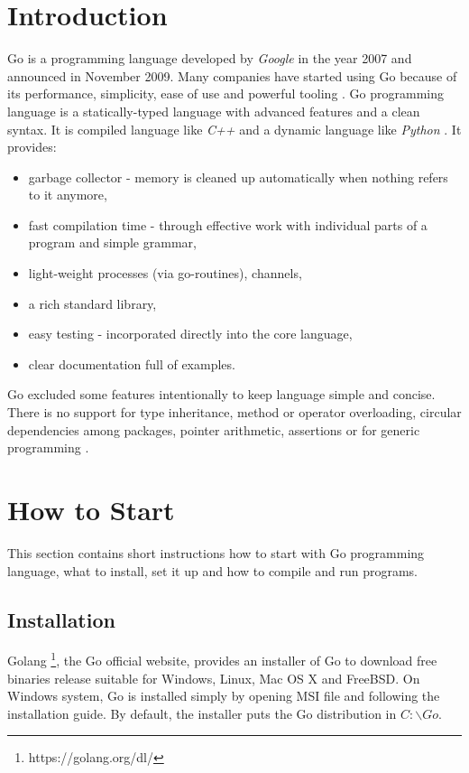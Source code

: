 \documentclass[
  12pt, 
  digital, %
  notable,   %
  nolof,     %
  nolot,     %
]{fithesis3}
\begin{document}
\section{Introduction}
Go is a programming language developed by \textit{Google} in the year 2007 and announced in 
November 2009. Many companies have started using Go because of its performance, simplicity, 
ease of use and powerful tooling \cite{doxsey2016introducing}. Go programming language is a 
statically-typed language with advanced features and a clean syntax. It is compiled language like \textit{C++} and a dynamic language like \textit{Python} \cite{harris_2015}. It provides:
\vskip0.1in
\begin{itemize}[leftmargin=2em,rightmargin=1em,itemsep=0.75\parskip,parsep=0em,topsep=0em,partopsep=0em]
\item garbage collector - memory is cleaned up automatically when nothing refers to it 
anymore,
\item fast compilation time - through effective work with individual parts of a program and simple grammar,
\item light-weight processes (via go-routines), channels,
\item a rich standard library,
\item easy testing - incorporated directly into the core language,
\item clear documentation full of examples.
\end{itemize}
\vskip0.1in

Go excluded some features intentionally to keep language simple and concise. There is no 
support for type inheritance, method or operator overloading, circular dependencies among 
packages, pointer arithmetic, assertions or for generic programming \cite{doxsey2016introducing, wiki-go}.

\section{How to Start}\label{howToStart}
This section contains short instructions how to start with Go programming language, what to install, set it up and how to compile and run programs.

\subsection{Installation}
Golang \footnote{https://golang.org/dl/}, the Go official website, provides an installer of Go to 
download free binaries release suitable for Windows, Linux, Mac OS X and FreeBSD. On Windows 
system, Go is installed simply by opening MSI file and following the installation guide. By default, the installer puts the Go distribution in $C:\backslash Go$. 
\end{document}
